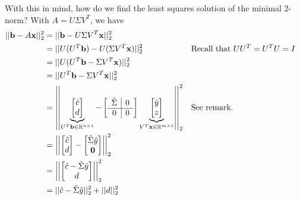 \documentclass[letterpaper]{article}
\newcommand{\0}{\mathbf{0}}
\renewcommand{\b}{\mathbf{b}}
\newcommand{\x}{\mathbf{x}}
\begin{document}
With this in mind, how do we find the least squares solution of the minimal 2-norm? With $A = U\Sigma V^T$, we have 
\begin{equation*}
    \begin{aligned}
        ||\b - A\x||_2^2 &= ||\b - U\Sigma V^T \x||_2^2 \\ 
            &= ||U(U^T \b) - U(\Sigma V^T \x)||_2^2 && \text{Recall that } UU^T = U^T U = I \\ 
            &= ||U(U^T \b - \Sigma V^T \x)||_2^2 \\ 
            &= ||U^T \b - \Sigma V^T \x||_2^2 \\ 
            &= \left|\left| \underbrace{\begin{bmatrix}
                \hat{c} \\ 
                d
            \end{bmatrix}}_{U^T \b \in \R^{n \times 1}} - \left[
                \begin{array}{c|c}
                    \hat{\Sigma} & \makebox{0} \\ 
                    \hline 
                    \makebox{0} & \makebox{0}
                \end{array}
            \right] \underbrace{\begin{bmatrix}
                \hat{y} \\ z
            \end{bmatrix}}_{V^T \x \in \R^{m \times 1}} \right|\right|_2^2 && \text{See remark.} \\ 
            &= \left|\left| \begin{bmatrix}
                \hat{c} \\ 
                d
            \end{bmatrix} - \begin{bmatrix}
                \hat{\Sigma} \hat{y} \\ 
                \0
            \end{bmatrix} \right|\right|_2^2  \\ 
            &= \left|\left| \begin{bmatrix}
                \hat{c} - \hat{\Sigma} \hat{y} \\ 
                d
            \end{bmatrix} \right|\right|_2^2 \\ 
            &= ||\hat{c} - \hat{\Sigma} \hat{y}||_2^2 + ||d||_2^2
    \end{aligned}
\end{equation*}
\end{document}
